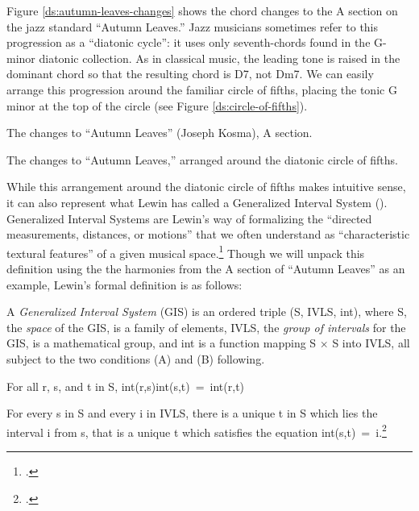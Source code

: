 \documentclass[diss]{subfiles}
\begin{document}
Figure \ref{ds:autumn-leaves-changes} shows the chord changes to the A section
on the jazz standard “Autumn Leaves.” Jazz musicians sometimes refer
to this progression as a “diatonic cycle”: it uses only seventh-chords found
in the G-minor diatonic collection. As in classical music, the leading
tone is raised in the dominant chord so that the resulting chord is D7, not
Dm7. We can easily arrange this progression around the familiar
circle of fifths, placing the tonic G minor at the top of the circle (see
Figure \ref{ds:circle-of-fifths}).

\figBeg
  \caption{The changes to “Autumn Leaves” (Joseph Kosma), A section.}
  \label{ds:autumn-leaves-changes}
\figEnd

\figBeg
  \caption{The changes to “Autumn Leaves,” arranged around the diatonic circle
    of fifths.}
  \label{ds:circle-of-fifths}
\figEnd

While this arrangement around the diatonic circle of fifths makes intuitive
sense, it can also represent what Lewin has called a Generalized Interval System
(\gis{}). Generalized Interval Systems are Lewin’s way of formalizing the
“directed measurements, distances, or motions” that we often understand as
“characteristic textural features” of a given musical
space.\footcite[16]{lewin:gmit} Though we will unpack this definition using
the the harmonies from the A section of “Autumn Leaves” as an example, Lewin’s
formal definition is as follows:
\begin{quoting}
  \singlespacing
  A \emph{Generalized Interval System} (GIS) is an ordered triple (S, IVLS,
  int), where S, the \emph{space} of the GIS, is a family of elements, IVLS,
  the \emph{group of intervals} for the GIS, is a mathematical group, and int
  is a function mapping S $\times$ S into IVLS, all subject to the two
  conditions (A) and (B) following.
  \begin{compactenum}[(A): ]
    \item For all r, s, and t in S, \mbox{int(r,s)int(s,t) = int(r,t)}
    \item For every s in S and every i in IVLS, there is a unique t in S which
      lies the interval i from s, that is a unique t which satisfies the
      equation \mbox{int(s,t) = i}.\footcite[Definition 2.3.1 (26)]{lewin:gmit}
  \end{compactenum}
\end{quoting}
\end{document}
